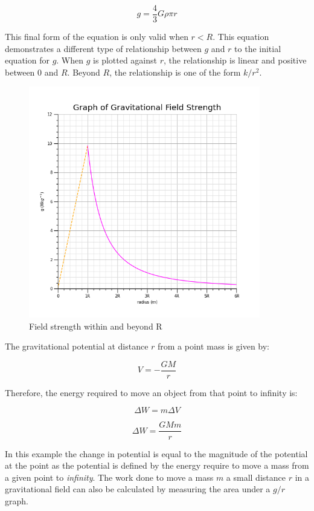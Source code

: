 \documentclass[12pt]{article}
\begin{document}
\[g = \dfrac{4}{3} G \rho \pi r\]

This final form of the equation is only valid when \(r < R\). This equation demonstrates a different type of relationship between \(g\) and \(r\) to the initial equation for \(g\). When \(g\) is plotted against \(r\), the relationship is linear and positive between \(0\) and \(R\). Beyond \(R\), the relationship is one of the form \(k/r^2\).

\begin{figure}[H]
\centering
\includegraphics[width=0.9\textwidth,keepaspectratio]{./images/gravitational_field_strength.png}
\caption{Field strength within and beyond R}
\end{figure}

The gravitational potential at distance \(r\) from a point mass is given by:

\[V = - \dfrac{GM}{r}\]

Therefore, the energy required to move an object from that point to infinity is:

\[\Delta W = m \Delta V\]

\[\Delta W = \dfrac{GMm}{r} \]

In this example the change in potential is equal to the magnitude of the potential at the point as the potential is defined by the energy require to move a mass from a given point to \emph{infinity}. The work done to move a mass \(m\) a small distance \(r\) in a gravitational field can also be calculated by measuring the area under a \(g/r\) graph.
\end{document}
